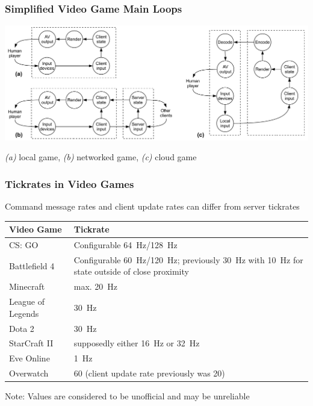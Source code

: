 \documentclass{UDEbeamerEN}
\begin{document}
\begin{frame}
	\frametitle{Simplified Video Game Main Loops}

	\begin{center}

		\includegraphics[width=\textwidth]{../../../models/component_interaction_full.pdf}

		{\small \textit{(a)} local game, \textit{(b)} networked game, \textit{(c)} cloud game}
	\end{center}

\end{frame}


\begin{frame}
	\frametitle{Tickrates in Video Games}

	\begin{center}
	Command message rates and client update rates can differ from server tickrates
	{\small
		\begin{tabu}{X[0.45]X}
			\toprule
			\textbf{Video Game} & \textbf{Tickrate} \\
			\midrule
			CS: GO & Configurable \SI{64}{\hertz}/\SI{128}{\hertz} \\
			Battlefield 4 & Configurable \SI{60}{\hertz}/\SI{120}{\hertz}; previously \SI{30}{\hertz} with \SI{10}{\hertz} for state outside of close proximity  \\
			Minecraft & max. \SI{20}{\hertz} \\
			League of Legends & \SI{30}{\hertz} \\
			Dota 2 & \SI{30}{\hertz} \\
			StarCraft II & supposedly either \SI{16}{\hertz} or \SI{32}{\hertz} \\
			Eve Online & \SI{1}{\hertz} \\
			Overwatch & 60 (client update rate previously was 20) \\
			\bottomrule
		\end{tabu}}

	Note: Values are considered to be unofficial and may be unreliable

	\end{center}

\end{frame}
\end{document}
